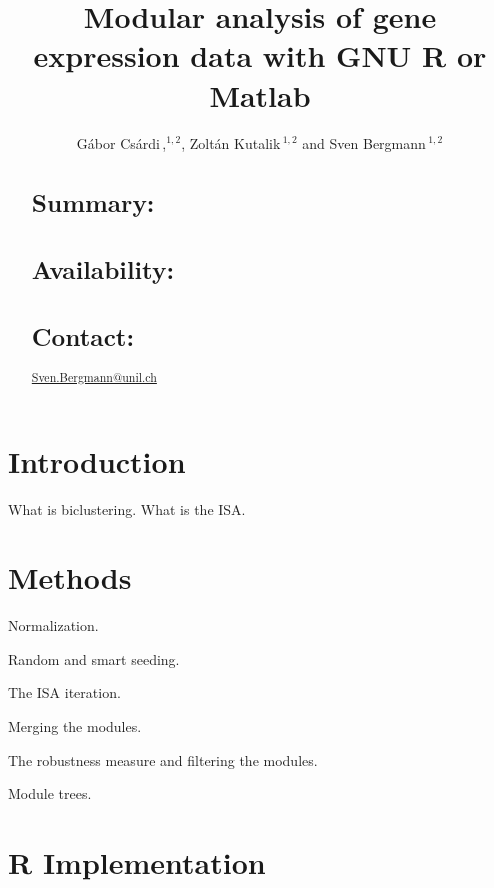 \documentclass{bioinfo}
\begin{document}

\title[Modular analysis]{Modular analysis of gene expression data with
  GNU R or Matlab}
\author[G\'abor Cs\'ardi \textit{et~al}]{G\'abor Cs\'ardi\,,$^{1,2}$,
  Zolt\'an Kutalik\,$^{1,2}$ and Sven Bergmann\,$^{1,2}$}
\address{$^{1}$Department of Medical Genetics, and 
  $^{2}$Swiss Institute of Bioinformatics,
  University of Lausanne, Rue de Bugnon 27 - DGM 328, CH-1005 Lausanne,
  Switzerland.}



\maketitle

\begin{abstract}

\section{Summary:}
\section{Availability:}
\section{Contact:} \href{Sven.Bergmann@unil.ch}{Sven.Bergmann@unil.ch}
\end{abstract}

\section{Introduction}

What is biclustering.
What is the ISA.

\section{Methods}

Normalization. 

Random and smart seeding. 

The ISA iteration. 

Merging the modules.

The robustness measure and filtering the modules. 

Module trees.

\section{R Implementation}
\end{document}
